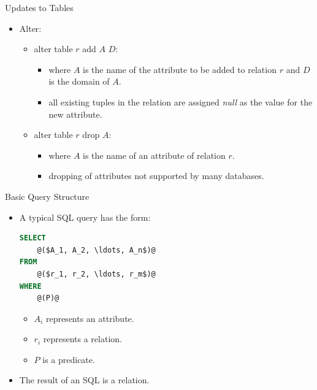 \documentclass{beamer}
\begin{document}
\begin{frame}{Updates to Tables}
    \begin{itemize}
        \item Alter:
        \begin{itemize}
            \item alter table $r$ add $A$ $D$:
            \begin{itemize}
                \item where $A$ is the name of the attribute to be added to relation $r$ and $D$ is the domain of $A$.
                \item all existing tuples in the relation are assigned \textit{null} as the value for the new attribute.
            \end{itemize}
            \item alter table $r$ drop $A$:
            \begin{itemize}
                \item where $A$ is the name of an attribute of relation $r$.
                \item dropping of attributes not supported by many databases.
            \end{itemize}
        \end{itemize}
    \end{itemize}
\end{frame}

\begin{frame}[fragile]{Basic Query Structure}
    \begin{itemize}
        \item A typical SQL query has the form:
        \begin{lstlisting}[language=SQL]
SELECT
    @($A_1, A_2, \ldots, A_n$)@
FROM
    @($r_1, r_2, \ldots, r_m$)@
WHERE
    @(P)@
        \end{lstlisting}
        \begin{itemize}
            \item $A_i$ represents an attribute.
            \item $r_i$ represents a relation.
            \item $P$ is a predicate.
        \end{itemize}
        \item The result of an SQL is a relation.
    \end{itemize}
\end{frame}
\end{document}
